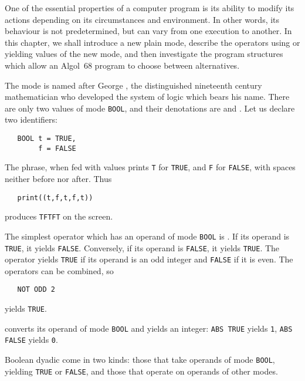 %
%
One of the essential properties of a computer program is its ability
to modify its actions depending on its circumstances and environment.
In other words, its behaviour is not predetermined, but can vary from
one execution to another. In this chapter, we shall introduce a new
plain mode, describe the operators using or yielding values of the
new mode, and then investigate the program structures which allow an
Algol~68 program to choose between alternatives.

\pagebreak
{}
 The mode  is named after George
, the distinguished nineteenth century
mathematician who developed the system of logic which bears his name.
There are only two values of mode \verb|BOOL|, and their denotations
are  and .  Let us declare two identifiers:
\begin{verbatim}
   BOOL t = TRUE,
        f = FALSE
\end{verbatim}
\noindent
The  phrase, when fed with  values prints
\verb|T| for \verb|TRUE|, and \verb|F| for \verb|FALSE|, with spaces
neither before nor after. Thus
\begin{verbatim}
   print((t,f,t,f,t))
\end{verbatim}
\noindent
produces \verb|TFTFT| on the screen.

The simplest operator which has an operand of mode \verb|BOOL| is
. If its operand is \verb|TRUE|, it yields \verb|FALSE|.
Conversely, if its operand is \verb|FALSE|, it yields \verb|TRUE|.
The operator  yields \verb|TRUE| if its operand is an odd
integer and \verb|FALSE| if it is even. The operators can be
combined, so
\begin{verbatim}
   NOT ODD 2
\end{verbatim}
\noindent
yields \verb|TRUE|.

 converts its operand of mode \verb|BOOL| and yields an
integer: \verb|ABS TRUE| yields \verb|1|, \verb|ABS FALSE| yields
\verb|0|.

Boolean dyadic  come in two
kinds: those that take operands of mode \verb|BOOL|, yielding
\verb|TRUE| or \verb|FALSE|, and those that operate on operands of
other modes.

